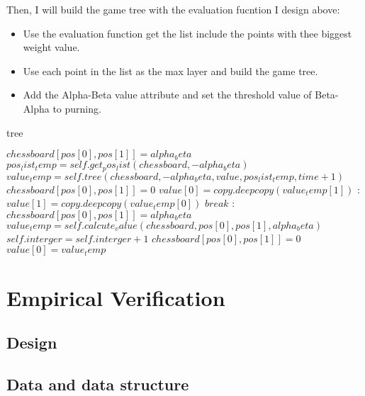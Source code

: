 \documentclass[conference,compsoc]{IEEEtran}
\begin{document}
  Then, I will build the game tree with the evaluation fucntion I design above:
  \begin{itemize}
    \item Use the evaluation function get the list include the points with thee biggest weight value.
    \item Use each point in the list as the max layer and build the game tree.
    \item Add the Alpha-Beta value attribute and set the threshold value of Beta-Alpha to purning.
  \end{itemize}
  \begin{algorithm}
    \caption{tree}
    \begin{algorithmic}[1]
        \State $ chessboard[pos[0],pos[1]] = alpha_beta $
        \State $ pos_list_temp = self.get_pos_list(chessboard, -alpha_beta) $
        \State $ value_temp = self.tree(chessboard,-alpha_beta,value,pos_list_temp,time+1) $
        \State $ chessboard[pos[0], pos[1]] = 0 $
                \State $ value[0] = copy.deepcopy(value_temp[1]) $
                \EndIf
            \Else:
                \State $ value[1] = copy.deepcopy(value_temp[0]) $
                \EndIf
                \EndIf    
            \State $ break $
            \EndIf    
        \Else:
        \State $ chessboard[pos[0], pos[1]] = alpha_beta $
        \State $ value_temp = self.calcute_value(chessboard, pos[0], pos[1], alpha_beta) $
        \State $ self.interger = self.interger + 1 $
        \State $ chessboard[pos[0], pos[1]] = 0 $
        \State $ value[0] = value_temp $
        \EndIf
        \EndFor
      \EndFunction
    \end{algorithmic}
  \end{algorithm}

\section{Empirical Verification}
\subsection{Design}

\subsection{Data and data structure}
\end{document}
